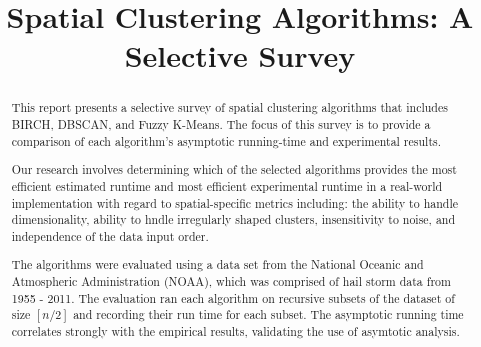 \documentclass[conference, 10pt]{IEEEtran}
\begin{document}
%
\title{Spatial Clustering Algorithms: A Selective Survey}


\author{
}

\maketitle


\begin{abstract}

This report presents a selective survey of spatial clustering algorithms that includes BIRCH, DBSCAN, and Fuzzy K-Means. The focus of this survey is to provide a comparison of each algorithm's asymptotic running-time and experimental results.

Our research involves determining which of the selected algorithms provides the most efficient estimated runtime and most efficient experimental runtime in a real-world implementation with regard to spatial-specific metrics including: the ability to handle dimensionality, ability to hndle irregularly shaped clusters, insensitivity to noise, and independence of the data input order.

The algorithms were evaluated using a data set from the National Oceanic and Atmospheric Administration (NOAA), which was comprised of hail storm data from 1955 - 2011. The evaluation ran each algorithm on recursive subsets of the dataset of size $[n/2]$ and recording their run time for each subset. The asymptotic running time correlates strongly with the empirical results, validating the use of asymtotic analysis.

\end{abstract}
\end{document}
